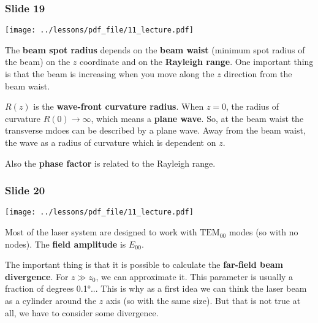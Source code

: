 \documentclass[../main/main.tex]{subfiles}
\begin{document}
\subsubsection*{Slide 19}

\begin{minipage}[]{0.5\linewidth}
\centering
\texttt{[image: ../lessons/pdf\_file/11\_lecture.pdf]}
\end{minipage}
\hspace{0.3cm}\vspace{0.3cm}
\begin{minipage}[c]{0.47\linewidth}

The \textbf{beam spot radius} depends on the \textbf{beam waist} (minimum spot radius of the beam) on the \( z \) coordinate and on the \textbf{Rayleigh range}. One important thing is that the beam is increasing when you move along the \( z \) direction from the beam waist.

\( R(z) \) is the \textbf{wave-front curvature radius}. When \( z=0 \), the radius of curvature \( R(0) \rightarrow  \infty  \), which means a \textbf{plane wave}. So, at the beam waist the transverse mdoes can be described by a plane wave. Away from the beam waist, the wave as a radius of curvature which is dependent on \( z \).

Also the \textbf{phase factor} is related to the Rayleigh range.

\end{minipage}


\subsubsection*{Slide 20}

\begin{minipage}[]{0.5\linewidth}
\centering
\texttt{[image: ../lessons/pdf\_file/11\_lecture.pdf]}
\end{minipage}
\hspace{0.3cm}\vspace{0.3cm}
\begin{minipage}[c]{0.47\linewidth}

Most of the laser system are designed to work with \( \text{TEM}_{00} \) modes (so with no nodes).
The \textbf{field amplitude} is \( E_{00} \).

The important thing is that it is possible to calculate the \textbf{far-field beam divergence}.
For \( z \gg z_0 \), we can approximate it. This parameter is usually a fraction of degrees 0.1°... This is why as a first idea we can think the laser beam as a cylinder around the \( z \) axis (so with the same size). But that is not true at all, we have to consider some divergence.

\end{minipage}
\end{document}
